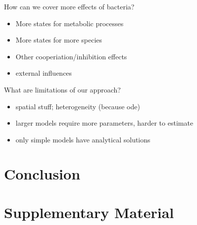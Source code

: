 \documentclass[10pt,A4paper]{article}
\numberwithin{equation}{section}
\newcommand{\beginsupplement}{%
  \renewcommand{\thesection}{}
  \setcounter{subsection}{0}
  \renewcommand{\thesubsection}{S\arabic{subsection}}
  \setcounter{table}{0}
  \renewcommand{\thetable}{S\arabic{table}}%
  \setcounter{figure}{0}
  \renewcommand{\thefigure}{S\arabic{figure}}%
  \setcounter{listing}{0}
  \renewcommand{\thelisting}{S\arabic{listing}}
}
\begin{document}
\noindent
How can we cover more effects of bacteria?
\begin{itemize}
    \item More states for metabolic processes
    \item More states for more species
    \item Other cooperiation/inhibition effects
    \item external influences
\end{itemize}

\noindent
What are limitations of our approach?
\begin{itemize}
    \item spatial stuff; heterogeneity (because \ac{ode})
    \item larger models require more parameters, harder to estimate
    \item only simple models have analytical solutions
\end{itemize}

\section{Conclusion}
\newpage
\printbibliography

\beginsupplement
\section{Supplementary Material}
\end{document}
